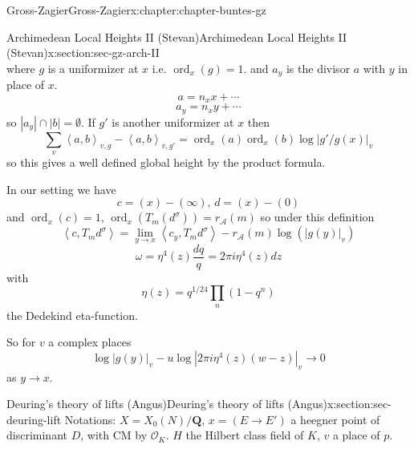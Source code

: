 \documentclass[oneside,10pt,]{book}
\numberwithin{equation}{section}
\newcommand{\pair}[2]{\left\langle #1, #2 \right\rangle}
\newcommand{\QQ}{\mathbf{Q}}
\newcommand{\ints}{\mathcal{O}}
\DeclareMathOperator{\ord}{ord}
\begin{document}
\begin{chapterptx}{Gross-Zagier}{}{Gross-Zagier}{}{}{x:chapter:chapter-buntes-gz}
\begin{sectionptx}{Archimedean Local Heights II (Stevan)}{}{Archimedean Local Heights II (Stevan)}{}{}{x:section:sec-gz-arch-II}
\begin{equation*}
\end{equation*}
where \(g\) is a uniformizer at \(x\) i.e. \(\ord_x(g) =1\). and \(a_y\) is the divisor \(a\) with \(y\) in place of \(x\).%
\begin{equation*}
a = n_x x + \cdots
\end{equation*}
%
\begin{equation*}
a_y = n_x y + \cdots
\end{equation*}
so \(|a_y | \cap |b| = \emptyset\). If \(g'\) is another uniformizer at \(x\) then%
\begin{equation*}
\sum_{v} \pair a b_{v,g}  -\pair ab_{v,g'} = \ord_x(a) \ord_x(b) \log|g'/g(x)|_v
\end{equation*}
so this gives a well defined global height by the product formula.%
\par
In our setting we have%
\begin{equation*}
c = (x) -(\infty ),\,d = (x) - (0)
\end{equation*}
and \(\ord_x(c)  = 1,\,\ord_x(T_m(d^\sigma )) = r_{\mathscr A}(m)\) so under this definition%
\begin{equation*}
\pair c {T_md^\sigma} = \lim_{y\to x} \pair {c_y}{T_md^\sigma } - r_{\mathscr A} (m)\log(|g(y)|_v)
\end{equation*}
%
\begin{equation*}
\omega=\eta^{4}(z) \frac{d q}{q}=2 \pi i \eta^{4}(z) d z
\end{equation*}
with%
\begin{equation*}
\eta(z)=q^{1/{24}} \prod_{n}\left(1-q^{n}\right)
\end{equation*}
the Dedekind eta-function.%
\par
So for \(v\)  a complex places%
\begin{equation*}
\log |g(y)|_{v}-u \log \left|2 \pi i \eta^{4}(z)(w-z)\right|_{v} \rightarrow 0
\end{equation*}
as \(y \to x\).%
\end{sectionptx}
%
%
\typeout{************************************************}
\typeout{************************************************}
%
\begin{sectionptx}{Deuring's theory of lifts (Angus)}{}{Deuring's theory of lifts (Angus)}{}{}{x:section:sec-deuring-lift}
Notations: \(X = X_0(N)/\QQ\), \(x  = (E \to E')\) a heegner point of discriminant \(D\), with CM by \(\ints_K\). \(H\) the Hilbert class field of \(K\), \(v\) a place of \(p\).%
\begin{equation*}

\end{equation*}
\end{sectionptx}
\end{chapterptx}
\end{document}
